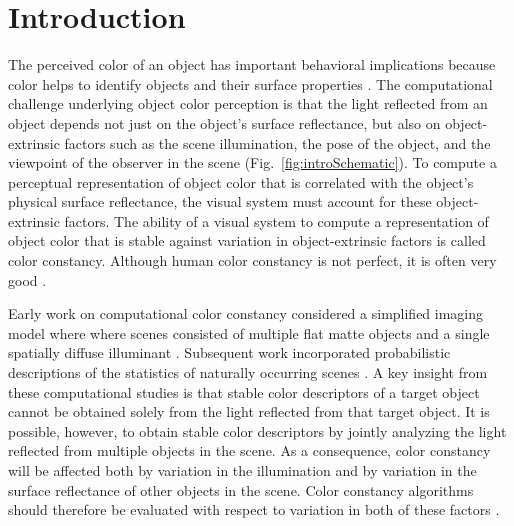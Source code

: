 \documentclass{jov}
\begin{document}
\maketitle

\section{Introduction}
The perceived color of an object has important behavioral implications because color helps to identify objects and their surface properties \cite{Mollon89, Jacobs81}.
The computational challenge underlying object color perception is that the light reflected from an object depends not just on the object's surface reflectance, but also 
on object-extrinsic factors such as the scene illumination, the pose of the object, and the viewpoint of the observer in the scene (Fig.~\ref{fig:introSchematic}).
To compute a perceptual representation of object color that is correlated with the object's physical surface reflectance, the visual system must account for these object-extrinsic factors.
The ability of a visual system to compute a representation of object color that is stable against variation in object-extrinsic factors is called color constancy. 
Although human color constancy is not perfect, it is often very good \cite{FosterColorConstancy, BrainardColorConstancy}. 

Early work on computational color constancy considered a simplified imaging model where where scenes consisted of multiple flat matte objects and a single spatially diffuse illuminant \cite{LandRetinex,Buchsbaum80,MaloneyWandell86}.
Subsequent work incorporated probabilistic descriptions of the statistics of naturally occurring scenes \cite{D'ZmuraConstancy3, D'ZmuraIversonSinger,BrainardFreeman}.
A key insight from these computational studies is that stable color descriptors of a target object cannot be obtained solely from the light reflected from that target object.
It is possible, however, to obtain stable color descriptors by jointly analyzing the light reflected from multiple objects in the scene.
As a consequence, color constancy will be affected both by variation in the illumination and by variation in the surface reflectance of other objects in the scene.  Color constancy algorithms should therefore be evaluated with respect to variation in both of these factors \cite{BrainardWandellRetinex,BrainardFreeman}. 
\end{document}
